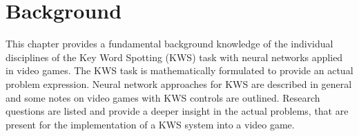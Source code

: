 





\chapter{Background}\label{sec:back}
\thesisStateNew
This chapter provides a fundamental background knowledge of the individual disciplines of the Key Word Spotting (KWS) task with neural networks applied in video games.
The KWS task is mathematically formulated to provide an actual problem expression.
Neural network approaches for KWS are described in general and some notes on video games with KWS controls are outlined.
Research questions are listed and provide a deeper insight in the actual problems, that are present for the implementation of a KWS system into a video game.





